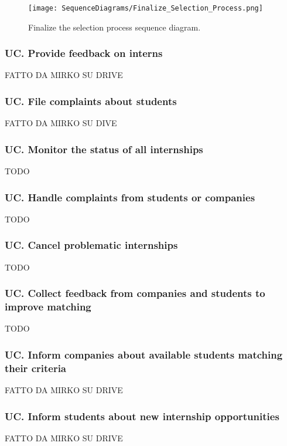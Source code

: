\begin{figure}[H]
    \begin{center}
        \texttt{[image: SequenceDiagrams/Finalize\_Selection\_Process.png]}
        \caption{Finalize the selection process sequence diagram.}
        \label{fig:finalize_the_selection_process_seqd}%
    \end{center}
\end{figure}

\subsubsection*{UC\cuc . Provide feedback on interns}
FATTO DA MIRKO SU DRIVE

\subsubsection*{UC\cuc . File complaints about students}
FATTO DA MIRKO SU DIVE

\subsubsection*{UC\cuc . Monitor the status of all internships}
TODO

\subsubsection*{UC\cuc . Handle complaints from students or companies}
TODO

\subsubsection*{UC\cuc . Cancel problematic internships}
TODO

\subsubsection*{UC\cuc . Collect feedback from companies and students to improve matching}
TODO

\subsubsection*{UC\cuc . Inform companies about available students matching their criteria}
FATTO DA MIRKO SU DRIVE

\subsubsection*{UC\cuc . Inform students about new internship opportunities}
FATTO DA MIRKO SU DRIVE

